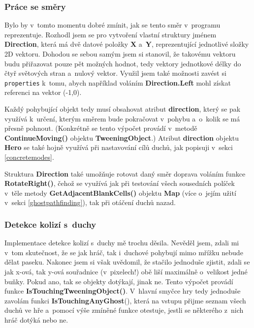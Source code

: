 \documentclass{article}
\begin{document}
\subsubsection{Práce se směry} \label{directions}
Bylo by v~tomto momentu dobré zmínit, jak se tento směr v~programu reprezentuje. Rozhodl jsem se pro vytvoření vlastní struktury jménem \textbf{Direction}, která má dvě datové položky \textbf{X} a~\textbf{Y}, reprezentující jednotlivé složky 2D vektoru. Dohodou se sebou samým jsem si stanovil, že takovému vektoru budu přiřazovat pouze pět možných hodnot, tedy vektory jednotkové délky do čtyř světových stran a~nulový vektor. Využil jsem také možnosti zavést si \verb|properties| k~tomu, abych například voláním \textbf{Direction.Left} mohl získat referenci na vektor (-1,0).

Každý pohybující objekt tedy musí obsahovat atribut \textbf{direction}, který se pak využívá k~určení, kterým směrem bude pokračovat v~pohybu a~o~kolik se má přesně pohnout. (Konkrétně se tento výpočet provádí v~metodě \textbf{ContinueMoving()} objektu \textbf{TweeningObject}.) Atribut \textbf{direction} objektu \textbf{Hero} se také hojně využívá při nastavování cílů duchů, jak popisuji v~sekci \ref{concretemodes}.

Struktura \textbf{Direction} také umožňuje rotovat daný směr doprava voláním funkce \textbf{RotateRight()}, čehož se využívá jak při testování všech sousedních políček v~těle metody \textbf{GetAdjacentBlankCells()} objektu \textbf{Map} (více o~jejím užití v~sekci \ref{ghostpathfinding}), tak při otáčení duchů nazad.

\subsubsection{Detekce kolizí s~duchy} \label{collisiondetection}
Implementace detekce kolizí s~duchy mě trochu děsila. Nevěděl jsem, zdali mi v~tom skutečnost, že se jak hráč, tak i~duchové pohybují mimo mřížku nebude dělat paseku. Nakonec jsem si však uvědomil, že stačilo jednoduše zjistit, zdali se jak x-ová, tak y-ová souřadnice (v~pixelech!) obě liší maximálně o~velikost jedné buňky. Pokud ano, tak se objekty dotýkají, jinak ne. Tento výpočet provádí funkce \textbf{IsTouchingTweeningObject()}. V~hlavní smyčce hry tedy jednoduše zavolám funkci \textbf{IsTouchingAnyGhost}(), která na vstupu přijme seznam všech duchů ve hře a~pomocí výše zmíněné funkce otestuje, jestli se některého z~nich hráč dotýká nebo ne.
\end{document}
